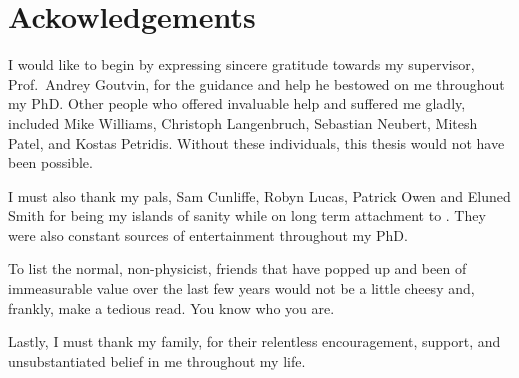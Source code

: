 \clearpage
\chapter*{\centering Ackowledgements}
\begin{center}
  {\setlength{\currentparskip}{\parskip}%
  \begin{minipage}{0.8\textwidth}
    \setlength{\parskip}{\currentparskip}%
    I would like to begin by expressing sincere gratitude towards my supervisor, Prof.~Andrey
    Goutvin, for the guidance and help he bestowed on me throughout my PhD.
    Other people who offered invaluable help and suffered me gladly, included
    Mike Williams, Christoph Langenbruch, Sebastian Neubert, Mitesh Patel, and
    Kostas Petridis.
    Without these individuals, this thesis would not have been possible.

    I must also thank my pals, Sam Cunliffe, Robyn Lucas, Patrick Owen and Eluned Smith for being
    my islands of sanity while on long
    term attachment to \cern.
    They were also constant sources of entertainment throughout my PhD.

    To list the normal, non-physicist, friends that have popped up and been of immeasurable value
    over the last few years would not be a little cheesy and, frankly, make a tedious read.
    You know who you are.

    Lastly, I must thank my family, for their relentless encouragement, support, and
    unsubstantiated belief in me throughout my life.

  \end{minipage}}
\end{center}



